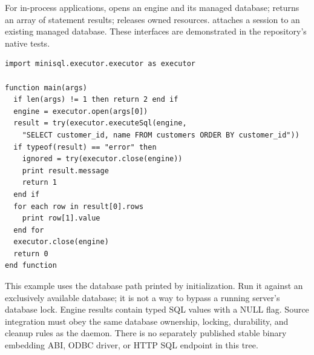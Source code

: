 For in-process applications,  opens an engine and its managed database;  returns an array of statement results;  releases owned resources.  attaches a session to an existing managed database. These interfaces are demonstrated in the repository's native tests.

\begin{lstlisting}
import minisql.executor.executor as executor

function main(args)
  if len(args) != 1 then return 2 end if
  engine = executor.open(args[0])
  result = try(executor.executeSql(engine,
    "SELECT customer_id, name FROM customers ORDER BY customer_id"))
  if typeof(result) == "error" then
    ignored = try(executor.close(engine))
    print result.message
    return 1
  end if
  for each row in result[0].rows
    print row[1].value
  end for
  executor.close(engine)
  return 0
end function
\end{lstlisting}

This example uses the database path printed by initialization. Run it against an exclusively available database; it is not a way to bypass a running server's database lock. Engine results contain typed SQL values with a NULL flag. Source integration must obey the same database ownership, locking, durability, and cleanup rules as the daemon. There is no separately published stable binary embedding ABI, ODBC driver, or HTTP SQL endpoint in this tree.

